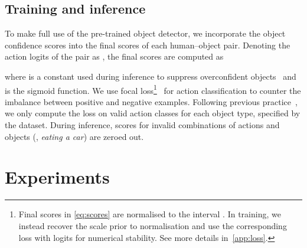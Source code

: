 \documentclass[10pt,twocolumn,letterpaper]{article}
\begin{document}
\subsection{Training and inference}

To make full use of the pre-trained object detector, we incorporate the object confidence scores into the final scores of each human--object pair. Denoting the action logits of the  pair  as , the final scores are computed as

where  is a constant used during inference to suppress overconfident objects~\cite{scg} and  is the sigmoid function. We use focal loss\footnote{Final scores in \cref{eq:scores} are normalised to the interval . In training, we instead recover the scale prior to normalisation and use the corresponding loss with logits for numerical stability. See more details in~\cref{app:loss}.}~\cite{retinanet} for action classification to counter the imbalance between positive and negative examples. Following previous practice~\cite{no-frills,scg}, we only compute the loss on valid action classes for each object type, specified by the dataset. During inference, scores for invalid combinations of actions and objects (\eg, \textit{eating a car}) are zeroed out.

\section{Experiments}
\end{document}
